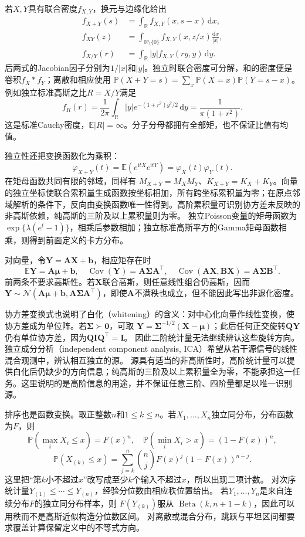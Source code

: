 若\(X,Y\)具有联合密度\(f_{X,Y}\)，换元与边缘化给出
\[
\begin{aligned}
f_{X+Y}(s)&=\int_{\mathbb R}f_{X,Y}(x,s-x)\,\mathrm dx,\\
f_{XY}(z)&=\int_{\mathbb R\setminus\{0\}}
 f_{X,Y}(x,z/x)\frac{\mathrm dx}{|x|},\\
f_{X/Y}(r)&=\int_{\mathbb R}|y|f_{X,Y}(ry,y)\,\mathrm dy.
\end{aligned}
\]
后两式的Jacobian因子分别为\(1/|x|\)和\(|y|\)。独立时联合密度可分解，和的密度便是卷积\(f_X*f_Y\)；离散和相应使用
\(\mathbb P(X+Y=s)=\sum_x\mathbb P(X=x)\mathbb P(Y=s-x)\)。
例如独立标准高斯之比\(R=X/Y\)满足
\[
f_R(r)=\frac1{2\pi}\int_{\mathbb R}|y|
 e^{-(1+r^2)y^2/2}\,\mathrm dy
=\frac1{\pi(1+r^2)}.
\]
这是标准Cauchy密度，\(\mathbb E|R|=\infty\)。分子分母都拥有全部矩，也不保证比值有均值。

独立性还把变换函数化为乘积：
\[
\varphi_{X+Y}(t)=\mathbb E(e^{\mathrm itX}e^{\mathrm itY})
=\varphi_X(t)\varphi_Y(t).
\]
在矩母函数共同有限的邻域，同样有
\(M_{X+Y}=M_XM_Y\)、\(K_{X+Y}=K_X+K_Y\)。向量的独立坐标使联合累积量生成函数按坐标相加，所有跨坐标累积量为零；在原点邻域解析的条件下，反向由变换函数唯一性得到。高阶累积量可识别协方差未反映的非高斯依赖，纯高斯的三阶及以上累积量则为零。
独立Poisson变量的矩母函数为
\(\exp\{\lambda(e^t-1)\}\)，相乘后参数相加；独立标准高斯平方的Gamma矩母函数相乘，则得到前面定义的卡方分布。

对向量，令\(\bm Y=\bm A\bm X+\bm b\)，相应矩存在时
\[
\mathbb E\bm Y=\bm A\bm\mu+\bm b,\quad
\operatorname{Cov}(\bm Y)=\bm A\bm\Sigma\bm A^\top,\quad
\operatorname{Cov}(\bm A\bm X,\bm B\bm X)=\bm A\bm\Sigma\bm B^\top.
\]
前两条不要求高斯性。若\(\bm X\)联合高斯，则任意线性组合仍高斯，因而
\(\bm Y\sim\mathcal N(\bm A\bm\mu+\bm b,\bm A\bm\Sigma\bm A^\top)\)，即使\(\bm A\)不满秩也成立，但不能因此写出非退化密度。

协方差变换式也说明了白化（whitening）的含义：对中心化向量作线性变换，使协方差成为单位阵。若\(\bm\Sigma\succ\bm0\)，可取
\(\bm Y=\bm\Sigma^{-1/2}(\bm X-\bm\mu)\)；此后任何正交旋转\(\bm Q\bm Y\)仍有单位协方差，因为\(\bm Q\bm I\bm Q^\top=\bm I\)。
因此二阶统计量无法继续辨认这些旋转方向。独立成分分析（independent component analysis, ICA）希望从若干源信号的线性混合观测中，辨认相互独立的源。
源具有适当的非高斯性时，高阶统计量可以提供白化后仍缺少的方向信息；纯高斯的三阶及以上累积量全为零，不能承担这一任务。这里说明的是高阶信息的用途，并不保证任意三阶、四阶量都足以唯一识别源。

排序也是函数变换。取正整数\(n\)和\(1\leq k\leq n\)。若\(X_1,\ldots,X_n\)独立同分布，分布函数为\(F\)，则
\[
\mathbb P(\max_iX_i\leq x)=F(x)^n,\quad
\mathbb P(\min_iX_i>x)=(1-F(x))^n,
\]
\[
\mathbb P(X_{(k)}\leq x)
=\sum_{j=k}^n\binom njF(x)^j(1-F(x))^{n-j}.
\]
这里把“第\(k\)小不超过\(x\)”改写成至少\(k\)个输入不超过\(x\)，所以出现二项计数。
对次序统计量\(Y_{(1)}\leq\cdots\leq Y_{(n)}\)，经验分位数由相应秩位置给出。
若\(Y_1,\ldots,Y_n\)是来自连续分布\(F\)的独立同分布样本，则
\(F(Y_{(k)})\)服从
\(\operatorname{Beta}(k,n+1-k)\)，因此可以用秩而不是高斯近似构造分位数区间。
对离散或混合分布，跳跃与平坦区间都要求覆盖计算保留定义中的不等式方向。

